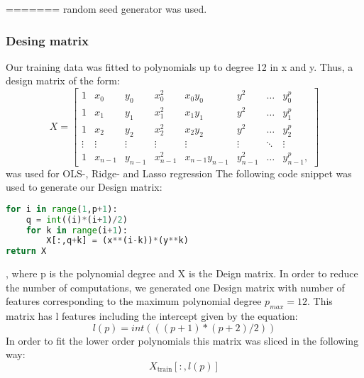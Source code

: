 =======
random seed generator was used. 

\subsubsection{Desing matrix}

Our training data was fitted to polynomials up
to degree 12 in x and y. Thus, a design matrix of the form:
\begin{equation*}
    X = 
    \begin{bmatrix}

        1 & x_{0} & y_0 & x_{0}^{2} & x_0 y_0 & y^2 & \dots &y_{0}^{p} \\
        1 & x_{1} & y_1 & x_{1}^{2} & x_1 y_1 & y^2 & \dots &y_{1}^{p} \\
        1 & x_{2} & y_2 & x_{2}^{2} & x_2 y_2 & y^2 & \dots &y_{2}^{p} \\
        \vdots &\vdots &\vdots &\vdots &\vdots & \vdots & \ddots & \vdots \\
        1&x_{n-1} & y_{n-1} & x_{n-1}^2 & x_{n-1} y_{n-1} & y_{n-1}^2 & \dots &y_{n-1}^{p}, 
    \end{bmatrix}
\end{equation*}
was used for OLS-, Ridge- and Lasso regression
The following code snippet was used to generate our Design matrix: 
\begin{lstlisting}[language=Python]
for i in range(1,p+1):
    q = int((i)*(i+1)/2)
    for k in range(i+1):
        X[:,q+k] = (x**(i-k))*(y**k)
return X
\end{lstlisting}
, where p is the polynomial degree and X is the Deign matrix. 
In order to reduce the number of computations, we generated one Design matrix
with number of features corresponding to the maximum polynomial degree $p_{max}
= 12$. This matrix has l features including the intercept given by the
equation: 
\begin{equation*}
        l(p) = int(((p+1)*(p+2)/2))		
\end{equation*}
In order to fit the lower order polynomials this matrix was sliced in the
following way:
\begin{equation*}
    X_{\text{train}}[:,l(p)] 
\end{equation*}

  




